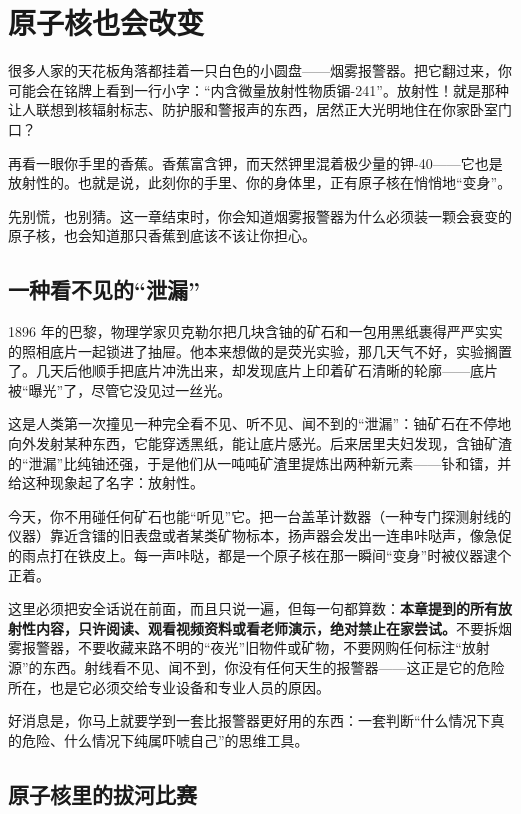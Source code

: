 \chapter{原子核也会改变}

\begin{kaichang}
很多人家的天花板角落都挂着一只白色的小圆盘——烟雾报警器。把它翻过来，你可能会在铭牌上看到一行小字：“内含微量放射性物质镅-241”。放射性！就是那种让人联想到核辐射标志、防护服和警报声的东西，居然正大光明地住在你家卧室门口？

再看一眼你手里的香蕉。香蕉富含钾，而天然钾里混着极少量的钾-40——它也是放射性的。也就是说，此刻你的手里、你的身体里，正有原子核在悄悄地“变身”。

先别慌，也别猜。这一章结束时，你会知道烟雾报警器为什么必须装一颗会衰变的原子核，也会知道那只香蕉到底该不该让你担心。
\end{kaichang}

\section{一种看不见的“泄漏”}

1896 年的巴黎，物理学家贝克勒尔把几块含铀的矿石和一包用黑纸裹得严严实实的照相底片一起锁进了抽屉。他本来想做的是荧光实验，那几天气不好，实验搁置了。几天后他顺手把底片冲洗出来，却发现底片上印着矿石清晰的轮廓——底片被“曝光”了，尽管它没见过一丝光。

这是人类第一次撞见一种完全看不见、听不见、闻不到的“泄漏”：铀矿石在不停地向外发射某种东西，它能穿透黑纸，能让底片感光。后来居里夫妇发现，含铀矿渣的“泄漏”比纯铀还强，于是他们从一吨吨矿渣里提炼出两种新元素——钋和镭，并给这种现象起了名字：放射性。

今天，你不用碰任何矿石也能“听见”它。把一台盖革计数器（一种专门探测射线的仪器）靠近含镭的旧表盘或者某类矿物标本，扬声器会发出一连串咔哒声，像急促的雨点打在铁皮上。每一声咔哒，都是一个原子核在那一瞬间“变身”时被仪器逮个正着。

这里必须把安全话说在前面，而且只说一遍，但每一句都算数：\textbf{本章提到的所有放射性内容，只许阅读、观看视频资料或看老师演示，绝对禁止在家尝试。}不要拆烟雾报警器，不要收藏来路不明的“夜光”旧物件或矿物，不要网购任何标注“放射源”的东西。射线看不见、闻不到，你没有任何天生的报警器——这正是它的危险所在，也是它必须交给专业设备和专业人员的原因。

好消息是，你马上就要学到一套比报警器更好用的东西：一套判断“什么情况下真的危险、什么情况下纯属吓唬自己”的思维工具。

\section{原子核里的拔河比赛}

